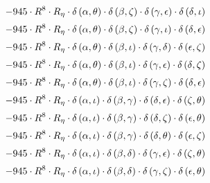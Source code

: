 \begin{subequations}
\begin{gather}
 \\[0.2em] \notag 		 - 945 \cdot R^{8} \cdot R_{\eta{}} \cdot \delta{}\left(\alpha{}, \theta{}\right) \cdot \delta{}\left(\beta{}, \zeta{}\right) \cdot \delta{}\left(\gamma{}, \epsilon{}\right) \cdot \delta{}\left(\delta{}, \iota{}\right) 
 \\[0.2em] \notag 		 - 945 \cdot R^{8} \cdot R_{\eta{}} \cdot \delta{}\left(\alpha{}, \theta{}\right) \cdot \delta{}\left(\beta{}, \zeta{}\right) \cdot \delta{}\left(\gamma{}, \iota{}\right) \cdot \delta{}\left(\delta{}, \epsilon{}\right) 
 \\[0.2em] \notag 		 - 945 \cdot R^{8} \cdot R_{\eta{}} \cdot \delta{}\left(\alpha{}, \theta{}\right) \cdot \delta{}\left(\beta{}, \iota{}\right) \cdot \delta{}\left(\gamma{}, \delta{}\right) \cdot \delta{}\left(\epsilon{}, \zeta{}\right) 
 \\[0.2em] \notag 		 - 945 \cdot R^{8} \cdot R_{\eta{}} \cdot \delta{}\left(\alpha{}, \theta{}\right) \cdot \delta{}\left(\beta{}, \iota{}\right) \cdot \delta{}\left(\gamma{}, \epsilon{}\right) \cdot \delta{}\left(\delta{}, \zeta{}\right) 
 \\[0.2em] \notag 		 - 945 \cdot R^{8} \cdot R_{\eta{}} \cdot \delta{}\left(\alpha{}, \theta{}\right) \cdot \delta{}\left(\beta{}, \iota{}\right) \cdot \delta{}\left(\gamma{}, \zeta{}\right) \cdot \delta{}\left(\delta{}, \epsilon{}\right) 
 \\[0.2em] \notag 		 - 945 \cdot R^{8} \cdot R_{\eta{}} \cdot \delta{}\left(\alpha{}, \iota{}\right) \cdot \delta{}\left(\beta{}, \gamma{}\right) \cdot \delta{}\left(\delta{}, \epsilon{}\right) \cdot \delta{}\left(\zeta{}, \theta{}\right) 
 \\[0.2em] \notag 		 - 945 \cdot R^{8} \cdot R_{\eta{}} \cdot \delta{}\left(\alpha{}, \iota{}\right) \cdot \delta{}\left(\beta{}, \gamma{}\right) \cdot \delta{}\left(\delta{}, \zeta{}\right) \cdot \delta{}\left(\epsilon{}, \theta{}\right) 
 \\[0.2em] \notag 		 - 945 \cdot R^{8} \cdot R_{\eta{}} \cdot \delta{}\left(\alpha{}, \iota{}\right) \cdot \delta{}\left(\beta{}, \gamma{}\right) \cdot \delta{}\left(\delta{}, \theta{}\right) \cdot \delta{}\left(\epsilon{}, \zeta{}\right) 
 \\[0.2em] \notag 		 - 945 \cdot R^{8} \cdot R_{\eta{}} \cdot \delta{}\left(\alpha{}, \iota{}\right) \cdot \delta{}\left(\beta{}, \delta{}\right) \cdot \delta{}\left(\gamma{}, \epsilon{}\right) \cdot \delta{}\left(\zeta{}, \theta{}\right) 
 \\[0.2em] \notag 		 - 945 \cdot R^{8} \cdot R_{\eta{}} \cdot \delta{}\left(\alpha{}, \iota{}\right) \cdot \delta{}\left(\beta{}, \delta{}\right) \cdot \delta{}\left(\gamma{}, \zeta{}\right) \cdot \delta{}\left(\epsilon{}, \theta{}\right) 

\end{gather}
\end{subequations}
